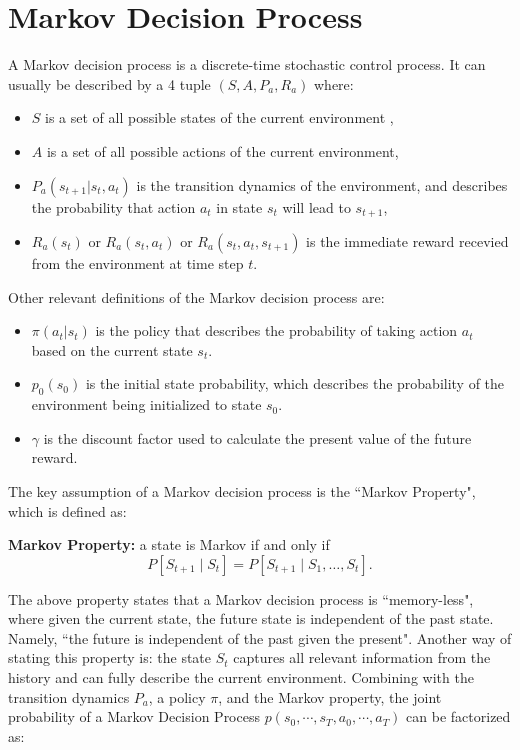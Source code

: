 \documentclass[11pt]{article}
\begin{document}
\section{Markov Decision Process}
A Markov decision process is a discrete-time stochastic control process. \cite{sutton} It can usually be described by a 4 tuple $\left(S, A, P_{a}, R_{a}\right)$ where:
\begin{itemize}
    \item $S$ is a set of all possible states of the current environment ,
    \item $A$ is a set of all possible actions of the current environment,
    \item $P_a(s_{t+1}|s_t, a_t)$ is the transition dynamics of the environment, and describes the probability that action $a_t$ in state $s_t$ will lead to $s_{t+1}$,
    \item $R_a(s_t)$ or $R_a(s_t, a_t)$ or $R_a(s_t, a_t, s_{t+1})$ is the immediate reward recevied from the environment at time step $t$. 
\end{itemize}

Other relevant definitions of the Markov decision process are: 

\begin{itemize}
    \item $\pi(a_t|s_t)$ is the policy that describes the probability of taking action $a_t$ based on the current state $s_t$. 
    \item $p_0(s_0)$ is the initial state probability, which describes the probability of the environment being initialized to state $s_0$. 
    \item $\gamma$ is the discount factor used to calculate the present value of the future reward.
\end{itemize}

The key assumption of a Markov decision process is the ``Markov Property", which is defined as: 

\textbf{Markov Property:} a state is Markov if and only if
$$P\left[S_{t+1} \mid S_{t}\right]=P\left[S_{t+1} \mid S_{1}, \ldots, S_{t}\right].$$

The above property states that a Markov decision process is ``memory-less", where given the current state, the future state is independent of the past state. Namely, ``the future is independent of the past given the present".  Another way of stating this property is: the state $S_t$ captures all relevant information from the history and can fully describe the current environment. Combining with the transition dynamics $P_a$, a policy $\pi$, and the Markov property, the joint probability of a Markov Decision Process $p\left(s_{0}, \cdots, s_{T}, a_{0}, \cdots, a_{T}\right)$ can be factorized as:
\end{document}

